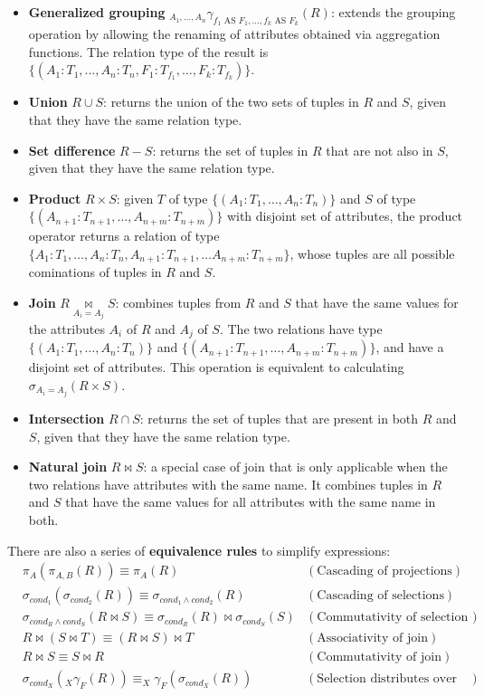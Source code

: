 \begin{itemize}
    \item \textbf{Generalized grouping} $_{A_1, \ldots, A_n} \gamma_{f_1 \text{ AS } F_1, \ldots, f_k \text{ AS } F_k} (R)$: extends the grouping operation by allowing the renaming of attributes obtained via aggregation functions. The relation type of the result is $\{(A_1:T_1, \ldots, A_n:T_n, F_1:T_{f_1}, \ldots, F_k:T_{f_k})\}$.
    \item \textbf{Union} $R \cup S$: returns the union of the two sets of tuples in $R$ and $S$, given that they have the same relation type.
    \item \textbf{Set difference} $R - S$: returns the set of tuples in $R$ that are not also in $S$, given that they have the same relation type.
    \item \textbf{Product} $R \times S$: given $T$ of type $\{(A_1:T_1, \ldots, A_n:T_n)\}$ and $S$ of type $\{(A_{n+1}:T_{n+1}, \ldots, A_{n+m}:T_{n+m})\}$ with disjoint set of attributes, the product operator returns a relation of type $\{A_1:T_1, \ldots, A_n:T_n, A_{n+1}:T_{n+1}, \ldots A_{n+m}:T_{n+m}\}$, whose tuples are all possible cominations of tuples in $R$ and $S$.
    \item \textbf{Join} $R \underset{A_i = A_j}{\bowtie} S$: combines tuples from $R$ and $S$ that have the same values for the attributes $A_i$ of $R$ and $A_j$ of $S$. The two relations have type $\{(A_1:T_1, \ldots, A_n:T_n)\}$ and $\{(A_{n+1}:T_{n+1}, \ldots, A_{n+m}:T_{n+m})\}$, and have a disjoint set of attributes. This operation is equivalent to calculating $\sigma_{A_i = A_j} (R \times S)$.
    \item \textbf{Intersection} $R \cap S$: returns the set of tuples that are present in both $R$ and $S$, given that they have the same relation type.
    \item \textbf{Natural join} $R \bowtie S$: a special case of join that is only applicable when the two relations have attributes with the same name. It combines tuples in $R$ and $S$ that have the same values for all attributes with the same name in both.
\end{itemize}
There are also a series of \textbf{equivalence rules} to simplify expressions:
\begin{align*}
    &\pi_A(\pi_{A,B}(R)) \equiv \pi_A(R) &(\text{Cascading of projections})\\
    &\sigma_{\textit{cond}_1}(\sigma_{\textit{cond}_2}(R)) \equiv \sigma_{\textit{cond}_1 \land \textit{cond}_2}(R) &(\text{Cascading of selections})\\
    &\sigma_{\textit{cond}_R \land \textit{cond}_S}(R \bowtie S) \equiv \sigma_{\textit{cond}_R}(R) \bowtie \sigma_{\textit{cond}_S}(S) &(\text{Commutativity of selection and join})\\
    &R \bowtie (S \bowtie T) \equiv (R \bowtie S) \bowtie T &(\text{Associativity of join})\\
    &R \bowtie S \equiv S \bowtie R &(\text{Commutativity of join})\\
    &\sigma_{\textit{cond}_X}(_X \gamma_{F}(R)) \equiv _X \gamma_{F}(\sigma_{\textit{cond}_X}(R)) &(\text{Selection distributes over grouping})
\end{align*}

